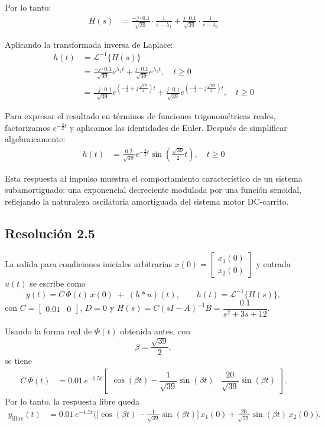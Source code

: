 \documentclass[
  11pt,
  letterpaper,
   addpoints,
  answers
  ]{exam}
\begin{document}
\begin{solution}
Por lo tanto:
\begin{align}
H(s) &= \frac{-j \cdot 0.1}{\sqrt{39}} \cdot \frac{1}{s-\lambda_1} + \frac{j \cdot 0.1}{\sqrt{39}} \cdot \frac{1}{s-\lambda_2}
\end{align}

Aplicando la transformada inversa de Laplace:
\begin{align}
h(t) &= \mathcal{L}^{-1}\{H(s)\} \\
&= \frac{-j \cdot 0.1}{\sqrt{39}} e^{\lambda_1 t} + \frac{j \cdot 0.1}{\sqrt{39}} e^{\lambda_2 t}, \quad t \geq 0 \\
&= \frac{-j \cdot 0.1}{\sqrt{39}} e^{\left(-\frac{3}{2}+j\frac{\sqrt{39}}{2}\right)t} + \frac{j \cdot 0.1}{\sqrt{39}} e^{\left(-\frac{3}{2}-j\frac{\sqrt{39}}{2}\right)t}, \quad t \geq 0
\end{align}

Para expresar el resultado en términos de funciones trigonométricas reales, factorizamos $e^{-\frac{3}{2}t}$ y aplicamos las identidades de Euler. Después de simplificar algebraicamente:
\begin{align}
h(t) &= \frac{0.2}{\sqrt{39}} e^{-\frac{3}{2}t} \sin\left(\frac{\sqrt{39}}{2}t\right), \quad t \geq 0
\end{align}

Esta respuesta al impulso muestra el comportamiento característico de un sistema subamortiguado: una exponencial decreciente modulada por una función senoidal, reflejando la naturaleza oscilatoria amortiguada del sistema motor DC-carrito.
\subsection*{Resolución 2.5}

La salida para condiciones iniciales arbitrarias $x(0)=\begin{bmatrix}x_1(0)\\ x_2(0)\end{bmatrix}$ y entrada $u(t)$ se escribe como
\begin{equation}
y(t)=C\,\Phi(t)\,x(0)\;+\;(h*u)(t),\qquad h(t)=\mathcal{L}^{-1}\!\{H(s)\},
\end{equation}
con $C=\begin{bmatrix}0.01&0\end{bmatrix}$, $D=0$ y $H(s)=C(sI-A)^{-1}B=\dfrac{0.1}{s^2+3s+12}$.

Usando la forma real de $\Phi(t)$ obtenida antes, con
\[
\beta=\frac{\sqrt{39}}{2},
\]
se tiene
\begin{align}
C\,\Phi(t)
&=0.01\,e^{-1.5t}\!
\begin{bmatrix}
\cos(\beta t)-\dfrac{1}{\sqrt{39}}\sin(\beta t) &
\dfrac{20}{\sqrt{39}}\sin(\beta t)
\end{bmatrix}.
\end{align}
Por lo tanto, la respuesta libre queda
\begin{align}
y_{\text{libre}}(t)
&=0.01\,e^{-1.5t}
\Bigg(
\Big[\cos(\beta t)-\frac{1}{\sqrt{39}}\sin(\beta t)\Big]\,x_1(0)
+\frac{20}{\sqrt{39}}\sin(\beta t)\,x_2(0)
\Bigg).
\end{align}


\end{solution}
\end{document}
